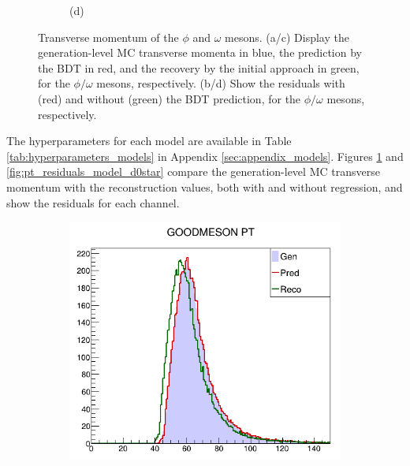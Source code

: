 \begin{myitemlist}
\begin{figure}[!ht]
\begin{subfigure}[t]{0.50\mylength}
            \caption{\footnotesize (d)}
        \end{subfigure}%
    \caption{Transverse momentum of the $\phi$ and $\omega$ mesons. (a/c) Display the generation-level MC transverse momenta in blue, the prediction by the BDT in red, and the recovery by the initial approach in green, for the $\phi/\omega$ mesons, respectively. (b/d) Show the residuals with (red) and without (green) the BDT prediction, for the $\phi/\omega$ mesons, respectively.}
    \label{fig:pt_residuals_model_omega_phi}
        \vspace*{-0.0cm}
    \end{figure}
    The hyperparameters for each model are available in Table \ref{tab:hyperparameters_models} in Appendix \ref{sec:appendix_models}. Figures \ref{fig:pt_residuals_model_omega_phi} and \ref{fig:pt_residuals_model_d0star} compare the generation-level MC transverse momentum with the reconstruction values, both with and without regression, and show the residuals for each channel.
    \begin{figure}[!ht]
        \captionsetup[subfigure]{labelformat=empty}
        \vspace*{-0.2cm}
        \centering
        \setlength{\mylength}{\textwidth}
        \begin{subfigure}[t]{0.50\mylength}
            \centering
            \includegraphics[width=0.45\mylength]{resources/plots/D0Star_2body_model_pt.png}

\end{subfigure}
\end{figure}
\end{myitemlist}

